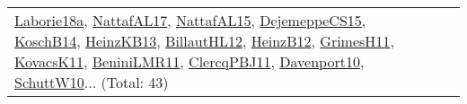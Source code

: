 {\begin{longtable}{lp{3cm}>{\raggedright}p{6cm}>{\raggedright}p{6cm}p{8cm}}
\href{papers/Laborie18a.pdf}{Laborie18a}\cite{Laborie18a}, \href{articles/NattafAL17.pdf}{NattafAL17}\cite{NattafAL17}, \href{articles/NattafAL15.pdf}{NattafAL15}\cite{NattafAL15}, \href{papers/DejemeppeCS15.pdf}{DejemeppeCS15}\cite{DejemeppeCS15}, \href{papers/KoschB14.pdf}{KoschB14}\cite{KoschB14}, \href{papers/HeinzKB13.pdf}{HeinzKB13}\cite{HeinzKB13}, \href{papers/BillautHL12.pdf}{BillautHL12}\cite{BillautHL12}, \href{papers/HeinzB12.pdf}{HeinzB12}\cite{HeinzB12}, \href{papers/GrimesH11.pdf}{GrimesH11}\cite{GrimesH11}, \href{articles/KovacsK11.pdf}{KovacsK11}\cite{KovacsK11}, \href{articles/BeniniLMR11.pdf}{BeniniLMR11}\cite{BeniniLMR11}, \href{papers/ClercqPBJ11.pdf}{ClercqPBJ11}\cite{ClercqPBJ11}, \href{papers/Davenport10.pdf}{Davenport10}\cite{Davenport10}, \href{papers/SchuttW10.pdf}{SchuttW10}\cite{SchuttW10}... (Total: 43)\\

\end{longtable}}
